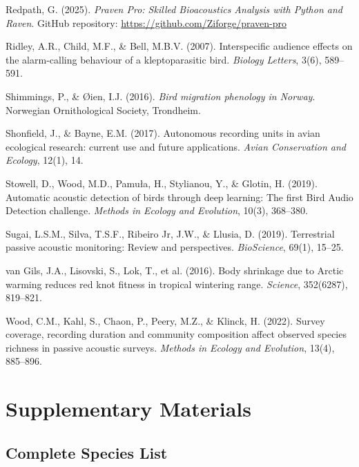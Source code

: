 \documentclass[twocolumn]{article}
\begin{document}
\begin{thebibliography}{99}
 Redpath, G. (2025). \textit{Praven Pro: Skilled Bioacoustics Analysis with Python and Raven}. GitHub repository: \url{https://github.com/Ziforge/praven-pro}

 Ridley, A.R., Child, M.F., \& Bell, M.B.V. (2007). Interspecific audience effects on the alarm-calling behaviour of a kleptoparasitic bird. \textit{Biology Letters}, 3(6), 589--591.

 Shimmings, P., \& Øien, I.J. (2016). \textit{Bird migration phenology in Norway}. Norwegian Ornithological Society, Trondheim.

 Shonfield, J., \& Bayne, E.M. (2017). Autonomous recording units in avian ecological research: current use and future applications. \textit{Avian Conservation and Ecology}, 12(1), 14.

 Stowell, D., Wood, M.D., Pamuła, H., Stylianou, Y., \& Glotin, H. (2019). Automatic acoustic detection of birds through deep learning: The first Bird Audio Detection challenge. \textit{Methods in Ecology and Evolution}, 10(3), 368--380.

 Sugai, L.S.M., Silva, T.S.F., Ribeiro Jr, J.W., \& Llusia, D. (2019). Terrestrial passive acoustic monitoring: Review and perspectives. \textit{BioScience}, 69(1), 15--25.

 van Gils, J.A., Lisovski, S., Lok, T., et al. (2016). Body shrinkage due to Arctic warming reduces red knot fitness in tropical wintering range. \textit{Science}, 352(6287), 819--821.

 Wood, C.M., Kahl, S., Chaon, P., Peery, M.Z., \& Klinck, H. (2022). Survey coverage, recording duration and community composition affect observed species richness in passive acoustic surveys. \textit{Methods in Ecology and Evolution}, 13(4), 885--896.

\end{thebibliography}

\newpage
\onecolumn

\appendix
\section{Supplementary Materials}

\subsection{Complete Species List}
\end{document}
